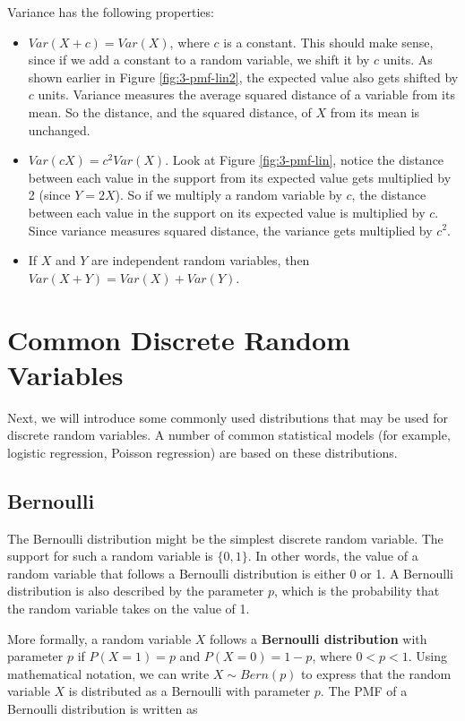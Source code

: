 \documentclass[
]{book}
\providecommand{\tightlist}{%
  \setlength{\itemsep}{0pt}\setlength{\parskip}{0pt}}
\begin{document}
Variance has the following properties:

\begin{itemize}
\tightlist
\item
  \(Var(X+c) = Var(X)\), where \(c\) is a constant. This should make sense, since if we add a constant to a random variable, we shift it by \(c\) units. As shown earlier in Figure \ref{fig:3-pmf-lin2}, the expected value also gets shifted by \(c\) units. Variance measures the average squared distance of a variable from its mean. So the distance, and the squared distance, of \(X\) from its mean is unchanged.
\item
  \(Var(cX) = c^2 Var(X)\). Look at Figure \ref{fig:3-pmf-lin}, notice the distance between each value in the support from its expected value gets multiplied by 2 (since \(Y=2X\)). So if we multiply a random variable by \(c\), the distance between each value in the support on its expected value is multiplied by \(c\). Since variance measures squared distance, the variance gets multiplied by \(c^2\).
\item
  If \(X\) and \(Y\) are independent random variables, then \(Var(X+Y) = Var(X) + Var(Y)\).
\end{itemize}

\hypertarget{commonDisRVs}{%
\section{Common Discrete Random Variables}\label{commonDisRVs}}

Next, we will introduce some commonly used distributions that may be used for discrete random variables. A number of common statistical models (for example, logistic regression, Poisson regression) are based on these distributions.

\hypertarget{bernoulli}{%
\subsection{Bernoulli}\label{bernoulli}}

The Bernoulli distribution might be the simplest discrete random variable. The support for such a random variable is \(\{0,1\}\). In other words, the value of a random variable that follows a Bernoulli distribution is either 0 or 1. A Bernoulli distribution is also described by the parameter \(p\), which is the probability that the random variable takes on the value of 1.

More formally, a random variable \(X\) follows a \textbf{Bernoulli distribution} with parameter \(p\) if \(P(X=1) = p\) and \(P(X=0) = 1-p\), where \(0<p<1\). Using mathematical notation, we can write \(X \sim Bern(p)\) to express that the random variable \(X\) is distributed as a Bernoulli with parameter \(p\). The PMF of a Bernoulli distribution is written as
\end{document}
